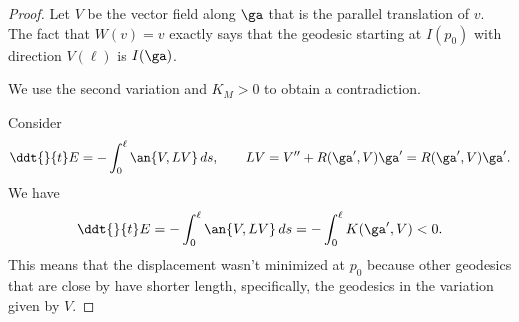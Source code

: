 \begin{proof}
Let $V$ be the vector field along $\ga$ that is the parallel translation of $v$. The fact that $W(v)=v$ exactly says that the geodesic starting at $I(p_0)$ with direction $V(\ell)$ is $I(\ga)$.

We use the second variation and $K_M>0$ to obtain a contradiction.

Consider 
\[
\ddt{}{t}E=-\int_0^{\ell} \an{V,LV}\,ds, \qquad LV=V''+R(\ga',V)\ga'=R(\ga',V)\ga'.
\]
We have %
\[
\ddt{}{t}E=-\int_0^{\ell}\an{V,LV}\,ds = -\int_0^{\ell}K(\ga',V)<0.
\]
This means that the displacement wasn't minimized at $p_0$ because other geodesics that are close by have shorter length, specifically, the geodesics in the variation given by $V$.
\end{proof}